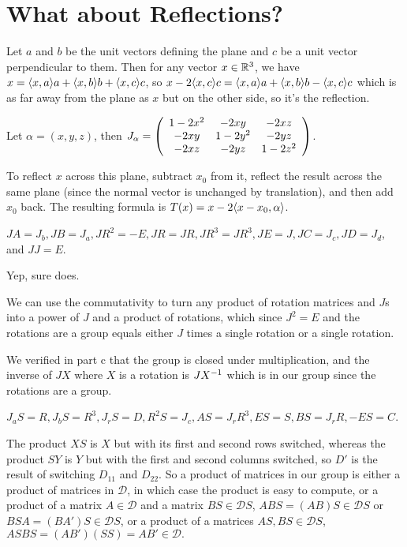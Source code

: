 \documentclass[11pt, oneside]{article}   	%
\begin{document}
\section{What about Reflections?}
\be
\item Let $a$ and $b$ be the unit vectors defining the plane and $c$ be a unit vector perpendicular to them. Then for any vector $x \in \mathbb{R}^3$, we have $x = \langle x, a \rangle a + \langle x, b \rangle b + \langle x, c \rangle c$, so $x - 2\langle x, c \rangle c = \langle x, a \rangle a + \langle x, b \rangle b - \langle x, c \rangle c$ which is as far away from the plane as $x$ but on the other side, so it's the reflection.
\item Let $\alpha = (x, y, z)$, then $J_\alpha = \left( \begin{array}{ccc} 1-2x^2 & -2xy & -2xz \\ -2xy & 1-2y^2 & -2yz \\ -2xz & -2yz & 1-2z^2 \end{array} \right)$.
\item To reflect $x$ across this plane, subtract $x_0$ from it, reflect the result across the same plane (since the normal vector is unchanged by translation), and then add $x_0$ back. The resulting formula is $T(x) = x - 2\langle x - x_0, \alpha \rangle$.
\item \be
\item $JA = J_b, JB = J_a, JR^2 = -E, JR = JR, JR^3 = JR^3, JE = J, JC = J_c, JD = J_d$, and $JJ = E$.
\item Yep, sure does.
\item We can use the commutativity to turn any product of rotation matrices and $J$s into a power of $J$ and a product of rotations, which since $J^2 = E$ and the rotations are a group equals either $J$ times a single rotation or a single rotation.
\item We verified in part c that the group is closed under multiplication, and the inverse of $JX$ where $X$ is a rotation is $JX^{-1}$ which is in our group since the rotations are a group.
\ee
\item \be
\item $J_aS = R, J_bS = R^3, J_rS = D, R^2S = J_c, AS = J_rR^3, ES = S, BS = J_rR, -ES = C$.
\item The product $XS$ is $X$ but with its first and second rows switched, whereas the product $SY$ is $Y$ but with the first and second columns switched, so $D'$ is the result of switching $D_{11}$ and $D_{22}$. So a product of matrices in our group is either a product of matrices in $\mathcal{D}$, in which case the product is easy to compute, or a product of a matrix $A \in \mathcal{D}$ and a matrix $BS \in \mathcal{D}S$, $ABS = (AB)S \in \mathcal{D}S$ or $BSA = (BA')S \in \mathcal{D}S$, or a product of a matrices $AS, BS \in \mathcal{D}S$, $ASBS = (AB')(SS) = AB' \in \mathcal{D}.$
\ee
\ee
\end{document}
